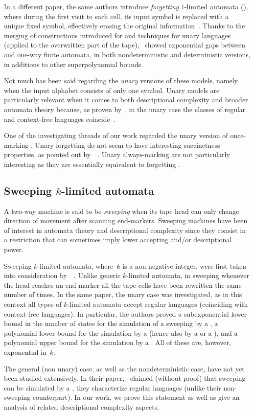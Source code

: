 In a different paper, the same authors introduce \emph{forgetting} $1$-limited automata (\FOLA), where during the first visit to each cell, its input symbol is replaced with a unique fixed symbol, effectively erasing the original information~\cite{PigPri23,JanMra+93}.
Thanks to the merging of constructions introduced for \AMOLA and techniques for unary languages (applied to the overwritten part of the tape),~\citeauthor{PigPri23} showed exponential gaps between \AMOLA and one-way finite automata, in both nondeterministic and deterministic versions, in additions to other superpolynomial bounds.

Not much has been said regarding the \emph{unary} versions of these models, namely when the input alphabet consists of only one symbol.
Unary models are particularly relevant when it comes to both descriptional complexity and broader automata theory because, as proven by~\citeauthor{GinRic62}, in the unary case the classes of regular and context-free languages coincide~\cite{GinRic62}.

One of the investigating threads of our work regarded the unary version of once-marking \OLAs.
Unary forgetting \OLAs do not seem to have interesting succinctness properties, as pointed out by~\citeauthor{PigPri23}~\cite{PigPri23}.
Unary always-marking \OLAs are not particularly interesting as they are essentially equivalent to forgetting \OLA.


\subsection{Sweeping \texorpdfstring{$k$}{k}-limited automata}
A two-way machine is said to be \emph{sweeping} when its tape head can only change direction of movement after scanning end-markers.
Sweeping machines have been of interest in automata theory and descriptional complexity since they consist in a restriction that can sometimes imply lower accepting and/or descriptional power.

Sweeping $k$-limited automata, where~$k$ is a non-negative integer, were first taken into consideration by~\citeauthor{KutPig+18}~\cite{KutPig+18}.
Unlike generic $k$-limited automata, in sweeping \kLA whenever the head reaches an end-marker all the tape cells have been rewritten the same number of times.
In the same paper, the unary case was investigated, as in this context all types of $k$-limited automata accept regular languages (coinciding with context-free languages).
In particular, the authors proved a subexponential lower bound in the number of states for the simulation of a sweeping \kDLA by a \ODFA, a polynomial lower bound for the simulation by a \TNFA (hence also by a \TDFA or a \ONFA), and a polynomial upper bound for the simulation by a \TDFA.
All of these are, however, exponential in~$k$.

The general (non unary) case, as well as the nondeterministic case, have not yet been studied extensively.
In their paper,~\citeauthor{KutPig+18} claimed (without proof) that sweeping \kLAs can be simulated by a \ONFA, \ie they characterize regular languages (unlike their non-sweeping counterpart).
In our work, we prove this statement as well as give an analysis of related descriptional complexity aspects.
